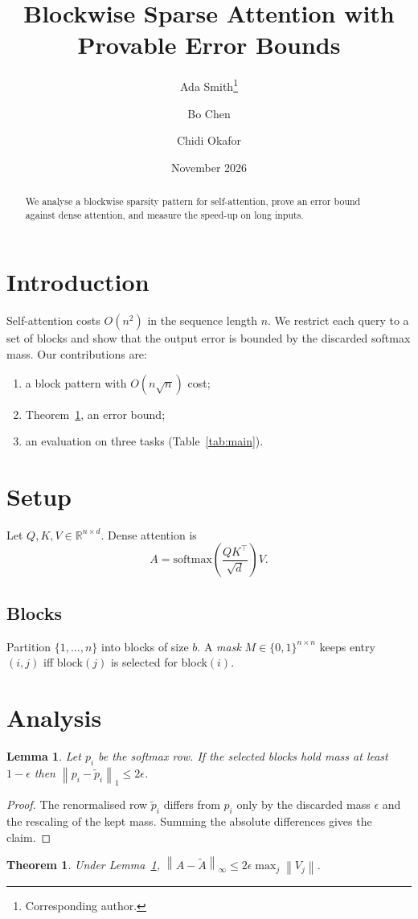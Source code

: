 \documentclass[11pt]{article}
\title{Blockwise Sparse Attention with Provable Error Bounds}
\author{Ada Smith\thanks{Corresponding author.} \and Bo Chen \and Chidi Okafor}
\date{November 2026}
\newtheorem{theorem}{Theorem}
\newtheorem{lemma}{Lemma}
\newcommand{\norm}[1]{\left\lVert #1 \right\rVert}
\begin{document}
\maketitle
\begin{abstract}
We analyse a blockwise sparsity pattern for self-attention, prove an error bound against dense attention, and measure the speed-up on long inputs.
\end{abstract}
\section{Introduction}
Self-attention costs $O(n^2)$ in the sequence length $n$. We restrict each query to a set of blocks and show that the output error is bounded by the discarded softmax mass. Our contributions are:
\begin{enumerate}
  \item a block pattern with $O(n\sqrt{n})$ cost;
  \item Theorem~\ref{thm:bound}, an error bound;
  \item an evaluation on three tasks (Table~\ref{tab:main}).
\end{enumerate}
\section{Setup}\label{sec:setup}
Let $Q,K,V\in\mathbb{R}^{n\times d}$. Dense attention is
\begin{equation}\label{eq:dense}
  A = \mathrm{softmax}\!\left(\frac{QK^\top}{\sqrt d}\right)V .
\end{equation}
\subsection{Blocks}
Partition $\{1,\dots,n\}$ into blocks of size $b$. A \emph{mask} $M\in\{0,1\}^{n\times n}$ keeps entry $(i,j)$ iff block$(j)$ is selected for block$(i)$.
\section{Analysis}
\begin{lemma}\label{lem:mass}
Let $p_i$ be the softmax row. If the selected blocks hold mass at least $1-\epsilon$ then $\norm{p_i - \tilde p_i}_1 \le 2\epsilon$.
\end{lemma}
\begin{proof}
The renormalised row $\tilde p_i$ differs from $p_i$ only by the discarded mass $\epsilon$ and the rescaling of the kept mass. Summing the absolute differences gives the claim.
\end{proof}
\begin{theorem}\label{thm:bound}
Under Lemma~\ref{lem:mass}, $\norm{A-\tilde A}_{\infty} \le 2\epsilon \max_j \norm{V_j}$.
\end{theorem}
\end{document}
